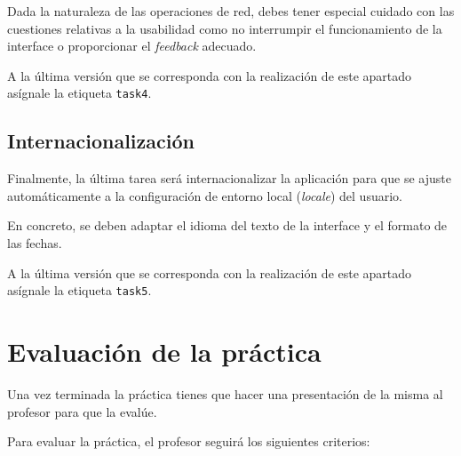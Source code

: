 \documentclass[11pt,a4paper]{article}
\begin{document}
Dada la naturaleza de las operaciones de red, debes tener especial
cuidado con las cuestiones relativas a la usabilidad como no
interrumpir el funcionamiento de la interface o proporcionar el
\textit{feedback} adecuado.


A la última versión que se corresponda con la realización de este
apartado asígnale la etiqueta \texttt{task4}.

\subsection{Internacionalización}

Finalmente, la última tarea será internacionalizar la aplicación para
que se ajuste automáticamente a la configuración de entorno local
(\textit{locale}) del usuario.

En concreto, se deben adaptar el idioma del texto de la interface y el
formato de las fechas.

A la última versión que se corresponda con la realización de este
apartado asígnale la etiqueta \texttt{task5}.


\section{Evaluación de la práctica}

Una vez terminada la práctica tienes que hacer una presentación de la
misma al profesor para que la evalúe.

Para evaluar la práctica, el profesor seguirá los siguientes
criterios:
\end{document}
